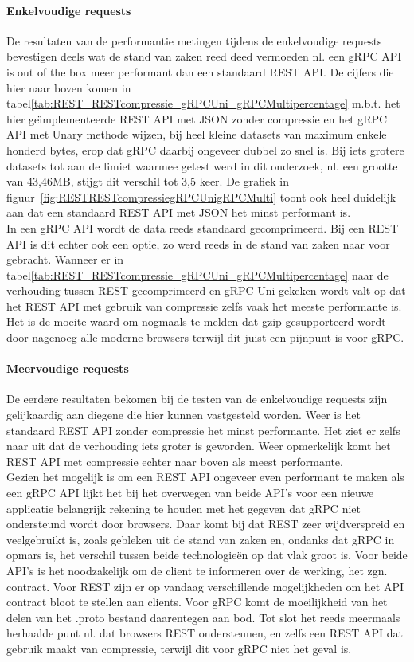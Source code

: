 \paragraph{Enkelvoudige requests}
De resultaten van de performantie metingen tijdens de enkelvoudige requests bevestigen deels wat de stand van zaken reed deed vermoeden nl. een gRPC API is out of the box
meer performant dan een standaard REST API. De cijfers die hier naar boven komen in tabel\ref{tab:REST_RESTcompressie_gRPCUni_gRPCMultipercentage} m.b.t.
het hier ge\"{\i}mplementeerde REST API met JSON zonder compressie en het gRPC API met Unary methode wijzen, bij heel kleine datasets van maximum enkele honderd bytes, erop dat gRPC
daarbij ongeveer dubbel zo snel is. Bij iets grotere datasets tot aan de limiet waarmee getest werd in dit onderzoek, nl. een grootte van 43,46MB, stijgt dit verschil tot 3,5 keer.
De grafiek in figuur~\ref{fig:RESTRESTcompressiegRPCUnigRPCMulti} toont ook heel duidelijk aan dat een standaard REST API met JSON het minst performant is.\\
In een gRPC API wordt de data reeds standaard gecomprimeerd. Bij een REST API is dit echter ook een optie, zo werd reeds in de stand van zaken naar voor gebracht. Wanneer er
in tabel\ref{tab:REST_RESTcompressie_gRPCUni_gRPCMultipercentage} naar de verhouding tussen REST gecomprimeerd en gRPC Uni gekeken wordt valt op dat het REST API met gebruik van compressie
zelfs vaak het meeste performante is. Het is de moeite waard om nogmaals te melden dat gzip gesupporteerd wordt door nagenoeg alle moderne browsers terwijl dit juist een pijnpunt is voor gRPC.\\

\paragraph{Meervoudige requests}
De eerdere resultaten bekomen bij de testen van de enkelvoudige requests zijn gelijkaardig aan diegene die hier kunnen vastgesteld worden. Weer is het standaard
REST API zonder compressie het minst performante. Het ziet er zelfs naar uit dat de verhouding iets groter is geworden. Weer opmerkelijk komt het REST API
met compressie echter naar boven als meest performante.\\

Gezien het mogelijk is om een REST API ongeveer even performant te maken als een gRPC API lijkt het bij het overwegen van beide API's voor een nieuwe applicatie
belangrijk rekening te houden met het gegeven dat gRPC niet ondersteund wordt door browsers. Daar komt bij dat REST zeer wijdverspreid en veelgebruikt is, zoals gebleken
uit de stand van zaken en, ondanks dat gRPC in opmars is, het verschil tussen beide technologie\"en op dat vlak groot is. Voor beide API's is het noodzakelijk om
de client te informeren over de werking, het zgn. contract. Voor REST zijn er op vandaag verschillende mogelijkheden om het API contract bloot te stellen aan clients.
Voor gRPC komt de moeilijkheid van het delen van het .proto bestand daarentegen aan bod. Tot slot het reeds meermaals herhaalde punt nl. dat browsers REST ondersteunen, en zelfs
een REST API dat gebruik maakt van compressie, terwijl dit voor gRPC niet het geval is.

